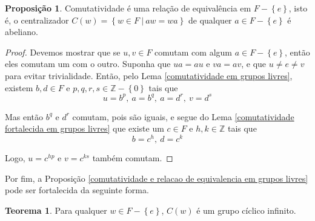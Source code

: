 \documentclass[a4paper,portuguese,11pt,twoside, leqno]{book}
\theoremstyle{definition}
\newtheorem{theorem}{Teorema}[section]
\newtheorem{prop}{Proposição}[section]
\begin{document}
	\begin{prop}
		\label{comutatividade e relacao de equivalencia em grupos livres}
		Comutatividade é uma relação de equivalência em $F - \left\{ e \right\}$, isto é, o centralizador $C(w) = \left\{ w\in F \ \vert \ aw = wa \right\}$ de qualquer $a\in F - \left\{e\right\}$ é abeliano.
	\end{prop}
	\begin{proof}
		Devemos mostrar que se $u,v\in F$ comutam com algum $a\in F - \left\{ e \right\}$, então eles comutam um com o outro. Suponha que $ua=au$ e $va = av$, e que $u\neq e\neq v$ para evitar trivialidade. Então, pelo Lema \eqref{comutatividade em grupos livres}, existem $b,d\in F$ e $p,q,r,s\in\mathbb{Z} - \left\{0\right\}$ tais que 
		\begin{equation*}
		u = b^p, \ a = b^q, \ a = d^r, \ v = d^s
		\end{equation*}
		\par\vspace{0.3cm} Mas então $b^q$ e $d^r$ comutam, pois são iguais, e segue do Lema \eqref{comutatividade fortalecida em grupos livres} que existe um $c\in F$ e $h,k\in\mathbb{Z}$ tais que
		\begin{equation*}
		b = c^h, \ d = c^k
		\end{equation*}
		\par\vspace{0.3cm} Logo, $u = c^{hp}$ e $v = c^{ks}$ também comutam.
	\end{proof}
	\par\vspace{0.3cm} Por fim, a Proposição \eqref{comutatividade e relacao de equivalencia em grupos livres} pode ser fortalecida da seguinte forma.
	\begin{theorem}
		\label{centralizadores em grupos livres}
		Para qualquer $w\in F - \left\{ e \right\}$, $C(w)$ é um grupo cíclico infinito.
	\end{theorem}
\end{document}
